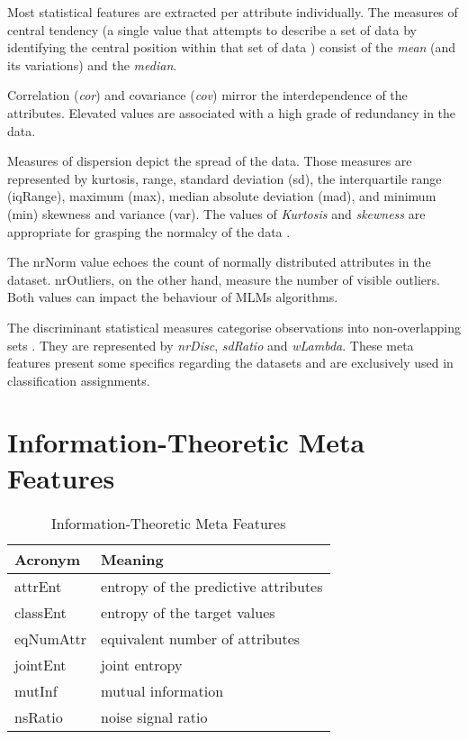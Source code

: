 Most statistical features are extracted per attribute individually. The measures of central tendency (a single value that attempts to describe a set of data by identifying the central position within that set of data \citep{weisberg1992central}) consist of the \textit{mean} (and its variations) and the \textit{median}. 

Correlation (\textit{cor}) and covariance (\textit{cov}) mirror the interdependence of the attributes. Elevated values are associated with a high grade of redundancy in the data. 

Measures of dispersion depict the spread of the data. Those measures are represented by kurtosis, range, standard deviation (sd), the interquartile range (iqRange), maximum (max), median absolute deviation (mad), and minimum (min) skewness and variance (var). The values of \textit{Kurtosis} and \textit{skewness} are appropriate for grasping the normalcy of the data \citep{vanschoren2010understanding}.

The nrNorm value echoes the count of normally distributed attributes in the dataset. nrOutliers, on the other hand, measure the number of visible outliers. Both values can impact the behaviour of MLMs algorithms.

The discriminant statistical measures categorise observations into non-overlapping sets \citep{mclachlan2005discriminant}. They are represented by \textit{nrDisc}, \textit{sdRatio} and \textit{wLambda}. These meta features present some specifics regarding the datasets and are exclusively used in classification assignments.


\section{Information-Theoretic Meta Features}
\begin{table}[h!]
\centering
\caption{Information-Theoretic  Meta Features}
\setlength{\tabcolsep}{8pt}
	\renewcommand{\arraystretch}{1.2}
    \begin{tabular}{ll}
    \hline
    Acronym & Meaning \\ \hline
    attrEnt & entropy of the predictive attributes\\
    classEnt & entropy of the target values\\
    eqNumAttr & equivalent number of attributes\\
    jointEnt & joint entropy\\
    mutInf & mutual information\\
    nsRatio & noise signal ratio\\
    \hline
    \end{tabular}
\label{tab:information-theoretic-mf}
\end{table}

